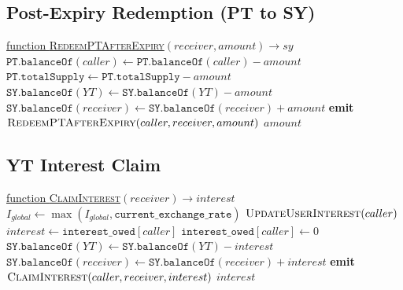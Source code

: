 \subsection{Post-Expiry Redemption (PT to SY)}

\begin{algorithm}[H]
\caption{Redeem PT for SY (Post-Expiry)}
\underline{function \textsc{RedeemPTAfterExpiry}}$(receiver, amount) \rightarrow sy$\;
\BlankLine
{}
$\texttt{PT.balanceOf}(caller) \gets \texttt{PT.balanceOf}(caller) - amount$\;
$\texttt{PT.totalSupply} \gets \texttt{PT.totalSupply} - amount$\;
$\texttt{SY.balanceOf}(YT) \gets \texttt{SY.balanceOf}(YT) - amount$\;
$\texttt{SY.balanceOf}(receiver) \gets \texttt{SY.balanceOf}(receiver) + amount$\;
\BlankLine
\textbf{emit} $\textsc{RedeemPTAfterExpiry}(caller, receiver, amount)$\;
\Return $amount$\;
\BlankLine
{}
\end{algorithm}

\subsection{YT Interest Claim}

\begin{algorithm}[H]
\caption{Claim YT Interest}
\underline{function \textsc{ClaimInterest}}$(receiver) \rightarrow interest$\;
\BlankLine
$I_{global} \gets \max(I_{global}, \texttt{current\_exchange\_rate})$\;
$\textsc{UpdateUserInterest}(caller)$\;
\BlankLine
$interest \gets \texttt{interest\_owed}[caller]$\;
$\texttt{interest\_owed}[caller] \gets 0$\;
\BlankLine
$\texttt{SY.balanceOf}(YT) \gets \texttt{SY.balanceOf}(YT) - interest$\;
$\texttt{SY.balanceOf}(receiver) \gets \texttt{SY.balanceOf}(receiver) + interest$\;
\BlankLine
\textbf{emit} $\textsc{ClaimInterest}(caller, receiver, interest)$\;
\Return $interest$\;
\BlankLine
{}
\end{algorithm}

